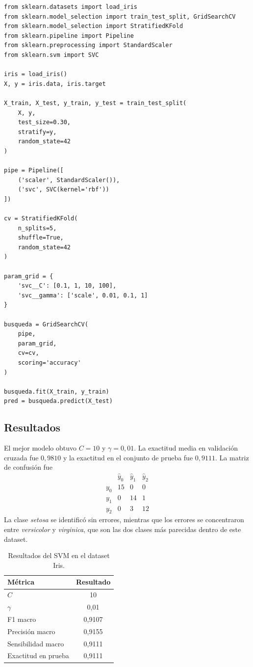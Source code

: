 \documentclass[14pt,twoside]{article}
\begin{document}
\begin{lstlisting}[style=pgpython,caption={Implementación del SVM con escalamiento y búsqueda de hiperparámetros.}]
from sklearn.datasets import load_iris
from sklearn.model_selection import train_test_split, GridSearchCV
from sklearn.model_selection import StratifiedKFold
from sklearn.pipeline import Pipeline
from sklearn.preprocessing import StandardScaler
from sklearn.svm import SVC

iris = load_iris()
X, y = iris.data, iris.target

X_train, X_test, y_train, y_test = train_test_split(
    X, y,
    test_size=0.30,
    stratify=y,
    random_state=42
)

pipe = Pipeline([
    ('scaler', StandardScaler()),
    ('svc', SVC(kernel='rbf'))
])

cv = StratifiedKFold(
    n_splits=5,
    shuffle=True,
    random_state=42
)

param_grid = {
    'svc__C': [0.1, 1, 10, 100],
    'svc__gamma': ['scale', 0.01, 0.1, 1]
}

busqueda = GridSearchCV(
    pipe,
    param_grid,
    cv=cv,
    scoring='accuracy'
)

busqueda.fit(X_train, y_train)
pred = busqueda.predict(X_test)
\end{lstlisting}

\subsection{Resultados}

El mejor modelo obtuvo $C=10$ y $\gamma=0,01$. La exactitud media en validación cruzada fue $0,9810$ y la exactitud en el conjunto de prueba fue $0,9111$. La matriz de confusión fue
\[
\begin{array}{c|ccc}
 & \hat y_0 & \hat y_1 & \hat y_2\\
\hline
y_0&15&0&0\\
y_1&0&14&1\\
y_2&0&3&12
\end{array}
\]
La clase \textit{setosa} se identificó sin errores, mientras que los errores se concentraron entre \textit{versicolor} y \textit{virginica}, que son las dos clases más parecidas dentro de este dataset.

\begin{table}[H]
\centering
\caption{Resultados del SVM en el dataset Iris.}
\begin{tabular}{lc}
\toprule
Métrica & Resultado \\
\midrule
$C$ & 10 \\
$\gamma$ & 0,01 \\
F1 macro & 0,9107 \\
Precisión macro & 0,9155 \\
Sensibilidad macro & 0,9111 \\
Exactitud en prueba & 0,9111 \\
\bottomrule
\end{tabular}
\end{table}
\end{document}
